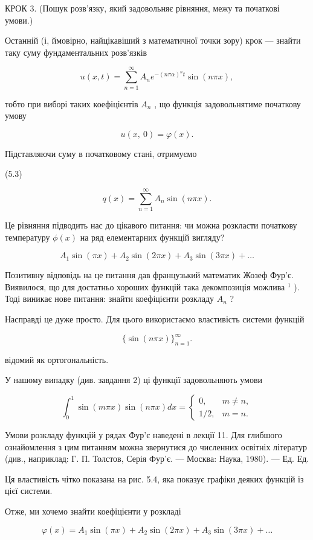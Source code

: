 \documentclass[
  ukrainian,
]{article}
\begin{document}
КРОК 3. (Пошук розв'язку, який задовольняє рівняння, межу та початкові
умови.)

Останній (і, ймовірно, найцікавіший з математичної точки зору) крок ---
знайти таку суму фундаментальних розв'язків

\[u(x, t) = \sum_{n=1}^{\infty} A_n e^{-(n\pi\alpha)^n t} \sin(n\pi x),\]

тобто при виборі таких коефіцієнтів \(A_n\) , що функція задовольнятиме
початкову умову

\[u\left( x,\ 0\right) =\varphi\left( x\right) .\]

Підставляючи суму в початковому стані, отримуємо

(5.3)

\[q(x) = \sum_{n=1}^{\infty} A_n \sin(n\pi x).\]

Це рівняння підводить нас до цікавого питання: чи можна розкласти
початкову температуру \(\phi(x)\) на ряд елементарних функцій вигляду?

\[A_1 \sin(\pi x) + A_2 \sin(2\pi x) + A_3 \sin(3\pi x) + \dots\]

Позитивну відповідь на це питання дав французький математик Жозеф Фур'є.
Виявилося, що для достатньо хороших функцій така декомпозиція можлива
\(^1\) ). Тоді виникає нове питання: знайти коефіцієнти розкладу \(A_n\)
?

Насправді це дуже просто. Для цього використаємо властивість системи
функцій

\[\{\sin(n\pi x)\}_{n=1}^{\infty}.\]

відомий як ортогональність.

У нашому випадку (див. завдання 2) ці функції задовольняють умови

\[\int_{0}^{1} \sin(m\pi x) \sin(n\pi x) dx = \begin{cases} 0, & m \neq n, \\ 1/2, & m = n. \end{cases}\]

Умови розкладу функцій у рядах Фур'є наведені в лекції 11. Для глибшого
ознайомлення з цим питанням можна звернутися до численних освітніх
літератур (див., наприклад: Г. П. Толстов, Серія Фур'є. --- Москва:
Наука, 1980). --- Ед. Ед.

Ця властивість чітко показана на рис. 5.4, яка показує графіки деяких
функцій із цієї системи.

Отже, ми хочемо знайти коефіцієнти у розкладі

\[\varphi(x) = A_1 \sin(\pi x) + A_2 \sin(2\pi x) + A_3 \sin(3\pi x) + \dots\]
\end{document}
